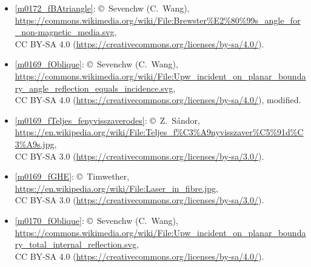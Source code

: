 \begin{itemize}
\item[Fig.] \label{m0172_fBAtriangle_Credit}
  \ref{m0172_fBAtriangle}:
  \copyright~Sevenchw (C.\ Wang), 
  \url{https://commons.wikimedia.org/wiki/File:Brewster%E2%80%99s_angle_for_non-magnetic_media.svg},\\ 
  CC BY-SA 4.0 (\url{https://creativecommons.org/licenses/by-sa/4.0/}).

\item[Fig.] \label{m0169_fOblique_Credit}
  \ref{m0169_fOblique}:
  \copyright~Sevenchw (C.\ Wang), 
  \url{https://commons.wikimedia.org/wiki/File:Upw_incident_on_planar_boundary_angle_reflection_equals_incidence.svg},\\ 
  CC BY-SA 4.0 (\url{https://creativecommons.org/licenses/by-sa/4.0/}), modified.

\item[Fig.] \label{m0169_fTeljes_fenyvisszaverodes_Credit}
  \ref{m0169_fTeljes_fenyvisszaverodes}:
  \copyright~Z.\ S\'{a}ndor, 
  \url{https://en.wikipedia.org/wiki/File:Teljes_f%C3%A9nyvisszaver%C5%91d%C3%A9s.jpg},\\ 
  CC BY-SA 3.0 (\url{https://creativecommons.org/licenses/by-sa/3.0/}).

\item[Fig.] \label{m0169_fGHE_Credit}
  \ref{m0169_fGHE}:
  \copyright~Timwether, 
  \url{https://en.wikipedia.org/wiki/File:Laser_in_fibre.jpg},\\ 
  CC BY-SA 3.0 (\url{https://creativecommons.org/licenses/by-sa/3.0/}).

\item[Fig.] \label{m0170_fOblique_Credit}
  \ref{m0170_fOblique}:
  \copyright~Sevenchw (C.\ Wang), 
  \url{https://commons.wikimedia.org/wiki/File:Upw_incident_on_planar_boundary_total_internal_reflection.svg},\\ 
  CC BY-SA 4.0 (\url{https://creativecommons.org/licenses/by-sa/4.0/}).

\end{itemize}

\twocolumn
